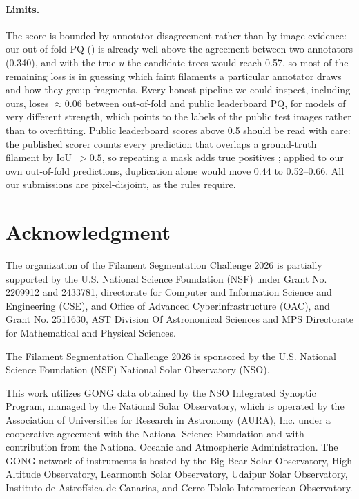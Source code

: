 \documentclass[sigconf]{acmart}
\begin{document}
\paragraph{Limits.} The score is bounded by annotator disagreement rather than by image evidence: our out-of-fold PQ (\pqfinal) is already well above the agreement between two annotators (0.340), and with the true $u$ the candidate trees would reach 0.57, so most of the remaining loss is in guessing which faint filaments a particular annotator draws and how they group fragments. Every honest pipeline we could inspect, including ours, loses $\approx$0.06 between out-of-fold and public leaderboard PQ, for models of very different strength, which points to the labels of the public test images rather than to overfitting. Public leaderboard scores above 0.5 should be read with care: the published scorer counts every prediction that overlaps a ground-truth filament by IoU~$>0.5$, so repeating a mask adds true positives \cite{perseus2026flaw}; applied to our own out-of-fold predictions, duplication alone would move 0.44 to 0.52--0.66. All our submissions are pixel-disjoint, as the rules require.

\section{Acknowledgment}
The organization of the Filament Segmentation Challenge 2026 is partially supported by the U.S. National Science Foundation (NSF) under Grant No. 2209912 and 2433781, directorate for Computer and Information Science and Engineering (CSE), and Office of Advanced Cyberinfrastructure (OAC), and Grant No. 2511630, AST Division Of Astronomical Sciences and MPS Directorate for Mathematical and Physical Sciences.

The Filament Segmentation Challenge 2026 is sponsored by the U.S. National Science Foundation (NSF) National Solar Observatory (NSO).

This work utilizes GONG data obtained by the NSO Integrated Synoptic Program, managed by the National Solar Observatory, which is operated by the Association of Universities for Research in Astronomy (AURA), Inc. under a cooperative agreement with the National Science Foundation and with contribution from the National Oceanic and Atmospheric Administration. The GONG network of instruments is hosted by the Big Bear Solar Observatory, High Altitude Observatory, Learmonth Solar Observatory, Udaipur Solar Observatory, Instituto de Astrofísica de Canarias, and Cerro Tololo Interamerican Observatory.



\end{document}
